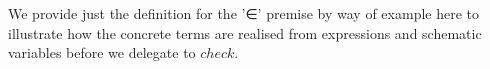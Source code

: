 We provide just the definition for the '∈' premise by way of example here to
illustrate how the concrete terms are realised from expressions and schematic
variables before we delegate to $check$.
